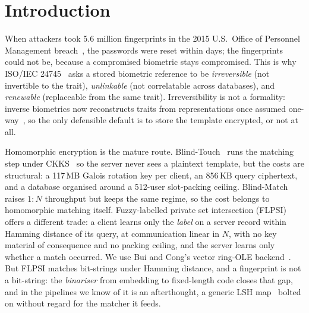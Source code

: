 \section{Introduction}
\label{sec:intro}

When attackers took 5.6 million fingerprints in the 2015 U.S.\ Office of Personnel Management
breach~\cite{Gootman16}, the passwords were reset within days; the fingerprints could not be, because
a compromised biometric stays compromised. This is why ISO/IEC 24745~\cite{ISO24745} asks a stored
biometric reference to be \emph{irreversible} (not invertible to the trait), \emph{unlinkable} (not
correlatable across databases), and \emph{renewable} (replaceable from the same trait). Irreversibility
is not a formality: inverse biometrics now reconstructs traits from representations once assumed
one-way~\cite{GomezBarreroGalbally20}, so the only defensible default is to store the template
encrypted, or not at all.

Homomorphic encryption is the mature route. Blind-Touch~\cite{ChoiWooKim24} runs the matching step
under CKKS~\cite{CKKS17} so the server never sees a plaintext template, but the costs are structural: a
117\,MB Galois rotation key per client, an 856\,KB query ciphertext, and a database organised around a
512-user slot-packing ceiling. Blind-Match~\cite{BlindMatch24} raises $1{:}N$ throughput but keeps the
same regime, so the cost belongs to homomorphic matching itself. Fuzzy-labelled private set
intersection (FLPSI)~\cite{UzunEtAl21} offers a different trade: a client learns only the \emph{label}
on a server record within Hamming distance of its query, at communication linear in $N$, with no key
material of consequence and no packing ceiling, and the server learns only whether a match occurred.
We use Bui and Cong's vector ring-OLE backend~\cite{BuiCong25}. But FLPSI matches bit-strings under
Hamming distance, and a fingerprint is not a bit-string: the \emph{binariser} from embedding to
fixed-length code closes that gap, and in the pipelines we know of it is an afterthought, a generic
LSH map~\cite{Charikar02,JiEtAl12} bolted on without regard for the matcher it feeds.

